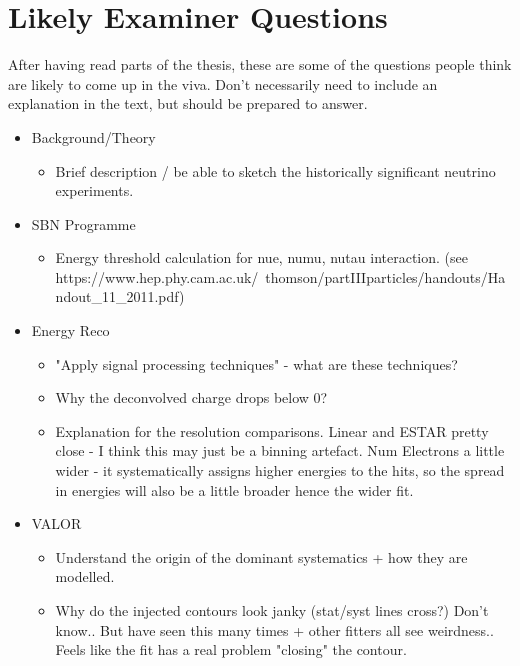 \chapter{Likely Examiner Questions}\label{Likely Examiner Questions}

After having read parts of the thesis, these are some of the questions people think are likely to come up in the viva. Don't necessarily need to include an explanation in the text, but should be prepared to answer.

\begin{itemize}
    \item Background/Theory
    \begin{itemize}
        \item Brief description / be able to sketch the historically significant neutrino experiments.
    \end{itemize}
    
    \item SBN Programme
    \begin{itemize}
        \item Energy threshold calculation for nue, numu, nutau interaction. (see https://www.hep.phy.cam.ac.uk/~thomson/partIIIparticles/handouts/Handout\_11\_2011.pdf)
    \end{itemize}
    
    \item Energy Reco
    \begin{itemize}
        \item "Apply signal processing techniques" - what are these techniques?
        \item Why the deconvolved charge drops below 0?
        \item Explanation for the resolution comparisons. Linear and ESTAR pretty close - I think this may just be a binning artefact. Num Electrons a little wider - it systematically assigns higher energies to the hits, so the spread in energies will also be a little broader hence the wider fit. 
    \end{itemize}
    
    \item VALOR
    \begin{itemize}
        \item Understand the origin of the dominant systematics + how they are modelled. 
        \item Why do the injected contours look janky (stat/syst lines cross?) Don't know.. But have seen this many times + other fitters all see weirdness.. Feels like the fit has a real problem "closing" the contour.  
    \end{itemize}
\end{itemize}